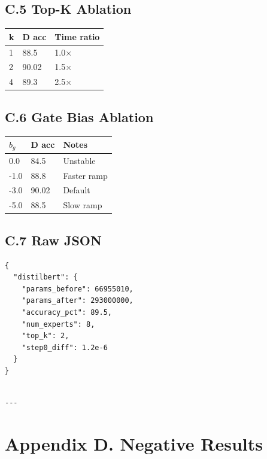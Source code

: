 \subsection{C.5 Top-K Ablation}

\begin{table}[H]
\centering
\small
\begin{tabular}{lll}
\toprule
\textbf{k} & \textbf{D acc} & \textbf{Time ratio} \\
\midrule
1 & 88.5 & 1.0$\times$ \\
2 & 90.02 & 1.5$\times$ \\
4 & 89.3 & 2.5$\times$ \\
\bottomrule
\end{tabular}
\end{table}

\subsection{C.6 Gate Bias Ablation}

\begin{table}[H]
\centering
\small
\begin{tabular}{lll}
\toprule
\textbf{$b_g$} & \textbf{D acc} & \textbf{Notes} \\
\midrule
0.0 & 84.5 & Unstable \\
-1.0 & 88.8 & Faster ramp \\
-3.0 & 90.02 & Default \\
-5.0 & 88.5 & Slow ramp \\
\bottomrule
\end{tabular}
\end{table}

\subsection{C.7 Raw JSON}

\begin{lstlisting}
{
  "distilbert": {
    "params_before": 66955010,
    "params_after": 293000000,
    "accuracy_pct": 89.5,
    "num_experts": 8,
    "top_k": 2,
    "step0_diff": 1.2e-6
  }
}
\end{lstlisting}
\begin{lstlisting}

---
\end{lstlisting}

\section{Appendix D. Negative Results}

